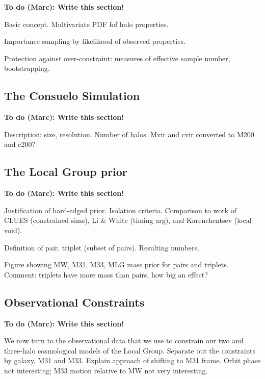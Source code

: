 \documentclass[iop,apj]{emulateapj}
\newcommand{\consuelo}{{\sc Consuelo }}
\newcommand{\todo}[2]{{\bf To do (#1): #2}}
\begin{document}
\todo{Marc}{Write this section!}

Basic concept. Multivariate PDF fof halo properties.

Importance sampling by likelihood of observed properties.

Protection against over-constraint: measures of effective sample number,
bootstrapping.


\subsection{The \consuelo Simulation}
\label{sec:sampling_b}

\todo{Marc}{Write this section!}

Description: size, resolution. Number of halos. Mvir and cvir converted to M200
and c200?



\subsection{The Local Group prior}
\label{sec:sampling_c}

\todo{Marc}{Write this section!}

Justification of hard-edged prior. Isolation criteria. Comparison to work of
CLUES (constrained sims), Li \& White (timing arg), and Karenchentsev (local
void). 

Definition of pair, triplet (subset of pairs). Resulting numbers. 

Figure showing MW, M31, M33, MLG mass prior for pairs and triplets. Comment:
triplets have more mass than pairs, how big an effect?


\subsection{Observational Constraints}
\label{sec:data}

\todo{Marc}{Write this section!}

We now turn to the observational data that we use to constrain our two and
three-halo cosmological models of the Local Group. Separate out
the constraints by galaxy, M31 and M33.  Explain approach of shifting to M31
frame. Orbit phase not interesting; M33 motion relative to MW not very
interesting.
\end{document}
